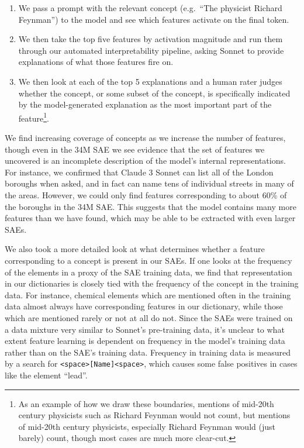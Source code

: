 \documentclass{article}
\begin{document}
\begin{enumerate}
    \item We pass a prompt with the relevant concept (e.g.~“The physicist Richard Feynman”) to the model and see which features activate on the final token.
    \item We then take the top five features by activation magnitude and run them through our automated interpretability pipeline, asking Sonnet to provide explanations of what those features fire on.
    \item We then look at each of the top 5 explanations and a human rater judges whether the concept, or some subset of the concept, is specifically indicated by the model-generated explanation as the most important part of the feature\footnote{As an example of how we draw these boundaries, mentions of mid-20th century physicists such as Richard Feynman would not count, but mentions of mid-20th century physicists, especially Richard Feynman would (just barely) count, though most cases are much more clear-cut.}.
\end{enumerate}

We find increasing coverage of concepts as we increase the number of features, though even in the 34M SAE we see evidence that the set of features we uncovered is an incomplete description of the model’s internal representations. For instance, we confirmed that Claude 3 Sonnet can list all of the London boroughs when asked, and in fact can name tens of individual streets in many of the areas. However, we could only find features corresponding to about 60\% of the boroughs in the 34M SAE. This suggests that the model contains many more features than we have found, which may be able to be extracted with even larger SAEs.

We also took a more detailed look at what determines whether a feature corresponding to a concept is present in our SAEs. If one looks at the frequency of the elements in a proxy of the SAE training data, we find that representation in our dictionaries is closely tied with the frequency of the concept in the training data. For instance, chemical elements which are mentioned often in the training data almost always have corresponding features in our dictionary, while those which are mentioned rarely or not at all do not. Since the SAEs were trained on a data mixture very similar to Sonnet’s pre-training data, it’s unclear to what extent feature learning is dependent on frequency in the model’s training data rather than on the SAE’s training data. Frequency in training data is measured by a search for \texttt{<space>[Name]<space>}, which causes some false positives in cases like the element “lead”.
\end{document}
